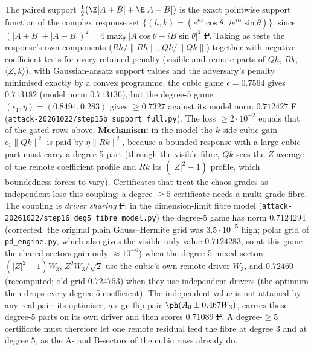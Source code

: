 \begin{negative}\label{neg:deg5-support}
The paired support $\frac12(\E|A+B|+\E|A-B|)$ is the exact pointwise support function of the complex response set
$\{(h,k)=(e^{i\alpha}\cos\theta,\,ie^{i\alpha}\sin\theta)\}$, since $(|A+B|+|A-B|)^2=4\max_\theta|A\cos\theta-iB\sin\theta|^2$ \st{P}. Taking as tests the
response's own components ($Rh/\|Rh\|$, $Qk/\|Qk\|$) together with negative-coefficient tests for every retained penalty (visible and remote parts of $Qh$,
$Rk$, $\langle Z,k\rangle$), with Gaussian-ansatz support values and the adversary's penalty minimised exactly by a convex programme, the cubic game
$\epsilon=0.7564$ gives $0.713182$ (model norm $0.713136$), but the degree-5 game $(\epsilon_1,\eta)=(0.8494,0.283)$ gives $\ge0.7327$ against its model norm
$0.712427$ \st{F} (\texttt{attack-20261022/step15b\_support\_full.py}). The loss $\ge2\cdot10^{-2}$ equals that of the gated rows above. \textbf{Mechanism:} in
the model the $k$-side cubic gain $\epsilon_1\|Qk\|^2$ is paid by $\eta\|Rk\|^2$, because a bounded response with a large cubic part must carry a degree-5
part (through the visible fibre, $Qk$ sees the $Z$-average of the remote coefficient profile and $Rk$ its $(|Z|^2-1)$ profile, which boundedness forces to vary).
Certificates that treat the chaos grades as independent lose this coupling; a degree-$\ge5$ certificate needs a multi-grade fibre.
The coupling is \emph{driver sharing} \st{F}: in the dimension-limit fibre model (\texttt{attack-20261022/step16\_deg5\_fibre\_model.py}) the degree-5 game has
norm $0.7124294$ (corrected: the original plain Gauss--Hermite grid was $3.5\cdot10^{-5}$ high; polar grid of \texttt{pd\_engine.py}, which also gives the visible-only value $0.7124283$, so at this game the shared sectors gain only $\approx10^{-6}$) when the degree-5 mixed sectors $(|Z|^2-1)W_3$, $Z^2\bar W_3/\sqrt2$ use the cubic's own remote driver $W_3$, and $0.72460$ (recomputed; old grid $0.724753$) when they use
independent drivers (the optimum then drops every degree-5 coefficient). The independent value is not attained by any real pair: its optimiser, a sign-flip pair $\ph(A_0\pm0.467W_3)$, carries these degree-5 parts on its own driver and then scores $0.71089$ \st{F}. A degree-$\ge5$ certificate must therefore let one remote residual feed the fibre at
degree $3$ and at degree $5$, as the A- and B-sectors of the cubic rows already do.
\end{negative}

